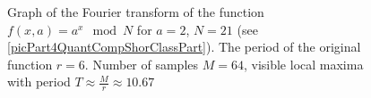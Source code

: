 \begin{figure}
\centering



\caption{Graph of the Fourier transform of the function 
  $f\left(x, a\right) = a^x \mod{N}$ for $a=2$, $N = 21$
  (see \autoref{picPart4QuantCompShorClassPart}). The period of the original
  function $r = 6$. Number of samples $M = 64$, visible local maxima
  with period $T \approx \frac{M}{r} \approx 10.67$}
\label{picPart4QuantCompShorClassPartFourier}
\end{figure}